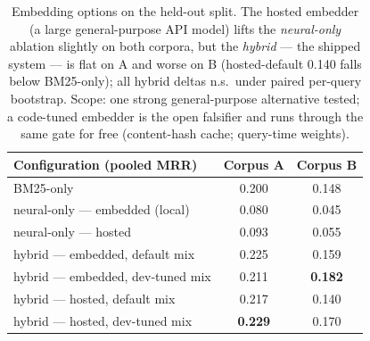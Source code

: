 \documentclass[twocolumn,10pt]{article}
\begin{document}
\begin{table}[H]
\centering\footnotesize
\setlength{\tabcolsep}{4pt}
\begin{tabular}{@{}lcc@{}}
\toprule
\textbf{Configuration (pooled MRR)} & \textbf{Corpus A} & \textbf{Corpus B}\\
\midrule
BM25-only & 0.200 & 0.148\\
neural-only --- embedded (local) & 0.080 & 0.045\\
neural-only --- hosted & 0.093 & 0.055\\
hybrid --- embedded, default mix & 0.225 & 0.159\\
hybrid --- embedded, dev-tuned mix & 0.211 & \textbf{0.182}\\
hybrid --- hosted, default mix & 0.217 & 0.140\\
hybrid --- hosted, dev-tuned mix & \textbf{0.229} & 0.170\\
\bottomrule
\end{tabular}
\caption{Embedding options on the held-out split. The hosted embedder (a large general-purpose API model) lifts the \emph{neural-only} ablation slightly on both corpora, but the \emph{hybrid} --- the shipped system --- is flat on A and worse on B (hosted-default 0.140 falls below BM25-only); all hybrid deltas n.s.\ under paired per-query bootstrap. Scope: one strong general-purpose alternative tested; a code-tuned embedder is the open falsifier and runs through the same gate for free (content-hash cache; query-time weights).}
\label{tab:embed}
\end{table}



\end{document}
